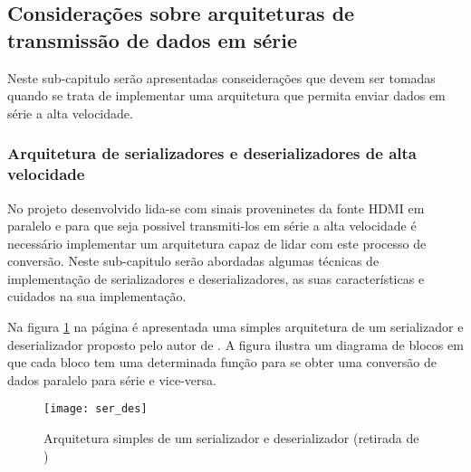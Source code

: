 %

\subsection{Considerações sobre arquiteturas de transmissão de dados em série} \label{serial_theory}
Neste sub-capitulo serão apresentadas conseiderações que devem ser tomadas quando se trata de implementar uma arquitetura que permita enviar dados em série a alta velocidade.
\subsubsection*{Arquitetura de serializadores e deserializadores de alta velocidade}

No projeto desenvolvido lida-se com sinais proveninetes da fonte HDMI em paralelo e para que seja possivel transmiti-los em série a alta velocidade é necessário implementar um arquitetura capaz de lidar com este processo de conversão. Neste sub-capitulo serão abordadas algumas técnicas de implementação de serializadores e deserializadores, as suas características e cuidados na sua implementação.

Na figura \ref{fig:arquiteturaSER} na página \pageref{fig:arquiteturaSER} é apresentada uma simples arquitetura de um serializador e deserializador proposto pelo autor de \cite{R032}. A figura ilustra um diagrama de blocos em que cada bloco tem uma determinada função para se obter uma conversão de dados paralelo para série e vice-versa.

\begin{figure}[h!]
	\begin{center}
		\leavevmode
		\texttt{[image: ser\_des]}
		\caption[Arquitetura simples de um serializador e deserializador]{Arquitetura simples de um serializador e deserializador (retirada de \cite{R032})}
		\label{fig:arquiteturaSER}
	\end{center}
\end{figure}

